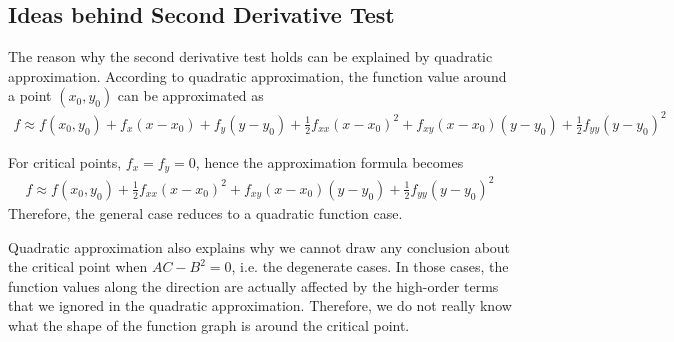 \documentclass{article}
\begin{document}
\subsection{Ideas behind Second Derivative Test}

The reason why the second derivative test holds can be explained by quadratic 
approximation. According to quadratic approximation, the function value around 
a point $(x_0, y_0)$ can be approximated as
\begin{gather*}
  f \approx f(x_0, y_0) + f_x(x - x_0) + f_y(y - y_0) + \frac{1}{2}f_{xx}(x - x_0)^2 + f_{xy}(x - x_0)(y - y_0) + \frac{1}{2}f_{yy}(y - y_0)^2
\end{gather*}

For critical points, $f_x = f_y = 0$, hence the approximation formula becomes 
\begin{gather*}
  f \approx f(x_0, y_0) + \frac{1}{2}f_{xx}(x - x_0)^2 + f_{xy}(x - x_0)(y - y_0) + \frac{1}{2}f_{yy}(y - y_0)^2
\end{gather*}
Therefore, the general case reduces to a quadratic function case.

Quadratic approximation also explains why we cannot draw any conclusion about 
the critical point when $AC - B^2 = 0$, i.e. the degenerate cases. In those cases, 
the function values along the direction are actually affected by the high-order 
terms that we ignored in the quadratic approximation. Therefore, we do not 
really know what the shape of the function graph is around the critical point.
\end{document}
